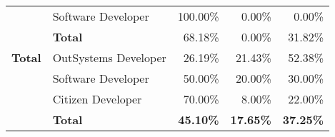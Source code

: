 \begin{table}[tb]
\begin{tabular}{@{}llrrr@{}}
                              & Software Developer   & 100.00\%                                                          & 0.00\%                                                                  & 0.00\%                                                        \\
                              & \textbf{Total}       & 68.18\%                                                           & 0.00\%                                                                  & 31.82\%                                                       \\ \midrule
    \rowcolor[HTML]{EFEFEF} 
    \textbf{Total}            & OutSystems Developer & 26.19\%                                                           & 21.43\%                                                                 & 52.38\%                                                       \\
    \rowcolor[HTML]{EFEFEF} 
                              & Software Developer   & 50.00\%                                                           & 20.00\%                                                                 & 30.00\%                                                       \\
    \rowcolor[HTML]{EFEFEF} 
                              & Citizen Developer    & 70.00\%                                                           & 8.00\%                                                                  & 22.00\%                                                       \\
    \rowcolor[HTML]{EFEFEF} 
                              & \textbf{Total}       & \textbf{45.10\%}                                                  & \textbf{17.65\%}                                                        & \textbf{37.25\%}                                              \\ \bottomrule
    \end{tabular}
    \end{table}



